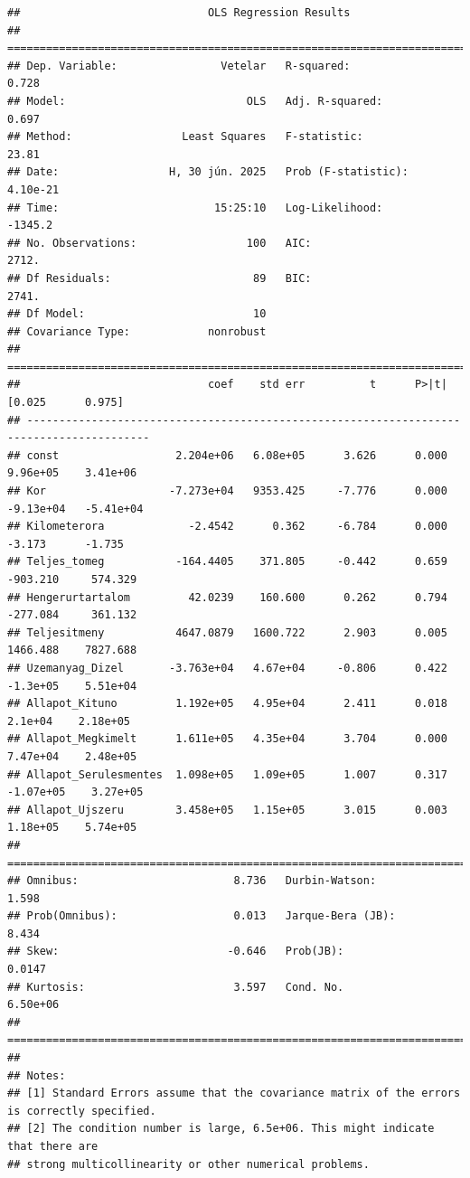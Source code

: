 \documentclass[
]{book}
\begin{document}
\begin{verbatim}
##                             OLS Regression Results                            
## ==============================================================================
## Dep. Variable:                Vetelar   R-squared:                       0.728
## Model:                            OLS   Adj. R-squared:                  0.697
## Method:                 Least Squares   F-statistic:                     23.81
## Date:                 H, 30 jún. 2025   Prob (F-statistic):           4.10e-21
## Time:                        15:25:10   Log-Likelihood:                -1345.2
## No. Observations:                 100   AIC:                             2712.
## Df Residuals:                      89   BIC:                             2741.
## Df Model:                          10                                         
## Covariance Type:            nonrobust                                         
## =========================================================================================
##                             coef    std err          t      P>|t|      [0.025      0.975]
## -----------------------------------------------------------------------------------------
## const                  2.204e+06   6.08e+05      3.626      0.000    9.96e+05    3.41e+06
## Kor                   -7.273e+04   9353.425     -7.776      0.000   -9.13e+04   -5.41e+04
## Kilometerora             -2.4542      0.362     -6.784      0.000      -3.173      -1.735
## Teljes_tomeg           -164.4405    371.805     -0.442      0.659    -903.210     574.329
## Hengerurtartalom         42.0239    160.600      0.262      0.794    -277.084     361.132
## Teljesitmeny           4647.0879   1600.722      2.903      0.005    1466.488    7827.688
## Uzemanyag_Dizel       -3.763e+04   4.67e+04     -0.806      0.422    -1.3e+05    5.51e+04
## Allapot_Kituno         1.192e+05   4.95e+04      2.411      0.018     2.1e+04    2.18e+05
## Allapot_Megkimelt      1.611e+05   4.35e+04      3.704      0.000    7.47e+04    2.48e+05
## Allapot_Serulesmentes  1.098e+05   1.09e+05      1.007      0.317   -1.07e+05    3.27e+05
## Allapot_Ujszeru        3.458e+05   1.15e+05      3.015      0.003    1.18e+05    5.74e+05
## ==============================================================================
## Omnibus:                        8.736   Durbin-Watson:                   1.598
## Prob(Omnibus):                  0.013   Jarque-Bera (JB):                8.434
## Skew:                          -0.646   Prob(JB):                       0.0147
## Kurtosis:                       3.597   Cond. No.                     6.50e+06
## ==============================================================================
## 
## Notes:
## [1] Standard Errors assume that the covariance matrix of the errors is correctly specified.
## [2] The condition number is large, 6.5e+06. This might indicate that there are
## strong multicollinearity or other numerical problems.
\end{verbatim}
\end{document}
